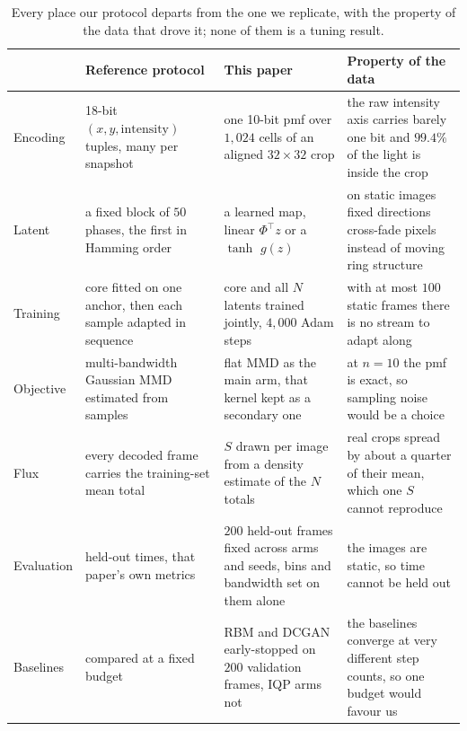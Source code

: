 \documentclass{article}
\begin{document}
\begin{table}[!b]
\centering
\caption{Every place our protocol departs from the one we replicate, with the property of the data
that drove it; none of them is a tuning result.}
\label{tab:diffs}
\scriptsize
\setlength{\tabcolsep}{3pt}
\begin{tabular}{p{}p{}p{}p{}}
\toprule
& Reference protocol & This paper & Property of the data \\
\midrule
Encoding &
18-bit $(x,y,\mathrm{intensity})$ tuples, many per snapshot &
one 10-bit pmf over $1{,}024$ cells of an aligned $32\times32$ crop &
the raw intensity axis carries barely one bit and $99.4\%$ of the light is inside the crop \\
Latent &
a fixed block of $50$ phases, the first in Hamming order &
a learned map, linear $\Phi^{\!\top} z$ or a $\tanh$ $g(z)$ &
on static images fixed directions cross-fade pixels instead of moving ring structure \\
Training &
core fitted on one anchor, then each sample adapted in sequence &
core and all $N$ latents trained jointly, $4{,}000$ Adam steps &
with at most $100$ static frames there is no stream to adapt along \\
Objective &
multi-bandwidth Gaussian MMD estimated from samples &
flat MMD as the main arm, that kernel kept as a secondary one &
at $n=10$ the pmf is exact, so sampling noise would be a choice \\
Flux &
every decoded frame carries the training-set mean total &
$S$ drawn per image from a density estimate of the $N$ totals &
real crops spread by about a quarter of their mean, which one $S$ cannot reproduce \\
Evaluation &
held-out times, that paper's own metrics &
$200$ held-out frames fixed across arms and seeds, bins and bandwidth set on them alone &
the images are static, so time cannot be held out \\
Baselines &
compared at a fixed budget &
RBM and DCGAN early-stopped on $200$ validation frames, IQP arms not &
the baselines converge at very different step counts, so one budget would favour us \\
\bottomrule
\end{tabular}
\end{table}
\end{document}
